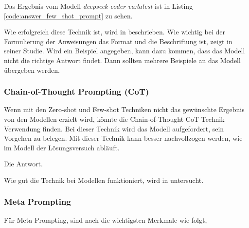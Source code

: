 

Das Ergebnis vom Modell \textit{deepseek-coder-va:latest} ist in Listing \ref{code:answer_few_shot_prompt} zu sehen.



Wie erfolgreich diese Technik ist, wird in \cite{brown-2020} beschrieben. Wie wichtig bei der Formulierung der Anweisungen das Format und die Beschriftung ist, zeigt \cite{min-2022} in seiner Studie. Wird ein Beispiel angegeben, kann dazu kommen, dass das Modell nicht die richtige Antwort findet. Dann sollten mehrere Beispiele an das Modell übergeben werden.


\subsubsection{Chain-of-Thought Prompting (CoT)}
Wenn mit den Zero-shot und Few-shot Techniken nicht das gewünschte Ergebnis von den Modellen erzielt wird, könnte die Chain-of-Thought \acrshort{CoT} Technik Verwendung finden. Bei dieser Technik wird das Modell aufgefordert, sein Vorgehen zu belegen. Mit dieser Technik kann besser nachvollzogen werden, wie im Modell der Lösungsversuch abläuft.\vspace{0.2cm}



Die Antwort.



Wie gut die Technik bei Modellen funktioniert, wird in \cite{wei-2022} untersucht.


\subsubsection{Meta Prompting}
Für Meta Prompting, sind nach \cite{zhang-2023} die wichtigsten Merkmale wie folgt,

